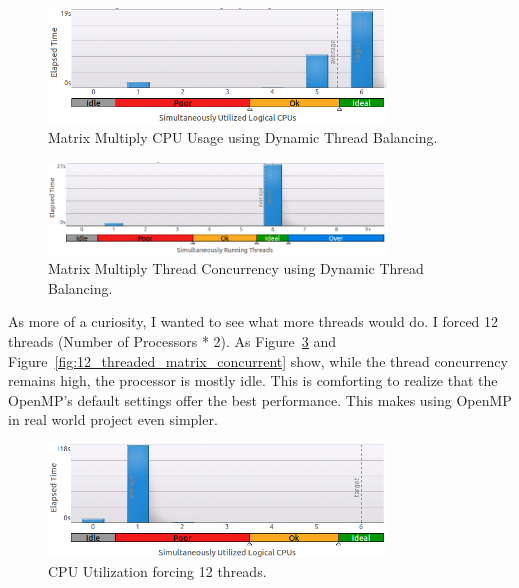 \documentclass[journal,10pt,onecolumn]{IEEEtran}
\begin{document}
\begin{figure}[!t]
\begin{center}
\includegraphics[width=0.8\textwidth]{figures/matrix_dynamic_schedule_cpu_usage.png}
\caption{Matrix Multiply CPU Usage using Dynamic Thread Balancing.}
\label{fig:matrix_dynamic_schedule_cpu_usage}
\end{center}
\end{figure}

\begin{figure}[!t]
\begin{center}
\includegraphics[width=0.8\textwidth]{figures/matrix_dynamic_schedule_thread_concurrency.png}
\caption{Matrix Multiply Thread Concurrency using Dynamic Thread Balancing.}
\label{fig:matrix_dynamic_schedule_concurrency}
\end{center}
\end{figure}


As more of a curiosity, I wanted to see what more threads would do.  I forced 12 threads 
(Number of Processors * 2).  As Figure~\ref{fig:12_threaded_matrix_cpu_usage} and 
Figure~\ref{fig:12_threaded_matrix_concurrent} show, while the thread concurrency remains
high, the processor is mostly idle.  This is comforting to realize that the OpenMP's default 
settings offer the best performance. This makes using OpenMP in real world project even simpler.


\begin{figure}[!t]
\begin{center}
\includegraphics[width=0.8\textwidth]{figures/12_threaded_matrix_thread_cpu_usage_histogram.png}
\caption{CPU Utilization forcing 12 threads.}
\label{fig:12_threaded_matrix_cpu_usage}
\end{center}
\end{figure}
\end{document}

